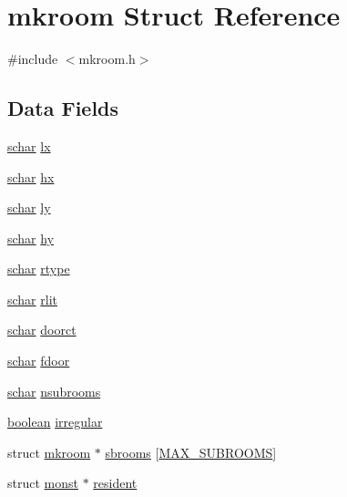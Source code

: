 \hypertarget{structmkroom}{\section{mkroom Struct Reference}
\label{structmkroom}
}


{\ttfamily \#include $<$mkroom.\+h$>$}

\subsection*{Data Fields}
\begin{DoxyCompactItemize}
\item 
\hyperlink{config_8h_a0fd9ce9d735064461bebfe6037026093}{schar} \hyperlink{structmkroom_afbd368ef987a49bd9ea830f2019a565f}{lx}
\item 
\hyperlink{config_8h_a0fd9ce9d735064461bebfe6037026093}{schar} \hyperlink{structmkroom_a1b738b591a7735add2af6d918c556543}{hx}
\item 
\hyperlink{config_8h_a0fd9ce9d735064461bebfe6037026093}{schar} \hyperlink{structmkroom_af60defeaae679cf06715a5b645e0d8b8}{ly}
\item 
\hyperlink{config_8h_a0fd9ce9d735064461bebfe6037026093}{schar} \hyperlink{structmkroom_aa767bcbf6e0de868bba6d2a1c7e7182e}{hy}
\item 
\hyperlink{config_8h_a0fd9ce9d735064461bebfe6037026093}{schar} \hyperlink{structmkroom_a0ad2dc1a7e0527610e96e830b2cad471}{rtype}
\item 
\hyperlink{config_8h_a0fd9ce9d735064461bebfe6037026093}{schar} \hyperlink{structmkroom_a3c07fba081cb449add4c4cc858541b16}{rlit}
\item 
\hyperlink{config_8h_a0fd9ce9d735064461bebfe6037026093}{schar} \hyperlink{structmkroom_af3299bfffb84e2a7cd1a07b4de7c1b53}{doorct}
\item 
\hyperlink{config_8h_a0fd9ce9d735064461bebfe6037026093}{schar} \hyperlink{structmkroom_ae40f76bfb5e37b9315e11abc5517b9d4}{fdoor}
\item 
\hyperlink{config_8h_a0fd9ce9d735064461bebfe6037026093}{schar} \hyperlink{structmkroom_ad45b51274d899541dc61dfa169e06ffb}{nsubrooms}
\item 
\hyperlink{global_8h_a531b10dd351aa162d7dcccd1966308b8}{boolean} \hyperlink{structmkroom_a394c3dd48b7fc60e0098c41afde6d6e8}{irregular}
\item 
struct \hyperlink{structmkroom}{mkroom} $\ast$ \hyperlink{structmkroom_ae0365d286660d2b39729c3e7a2c4dc66}{sbrooms} \mbox{[}\hyperlink{global_8h_a434176f3fe018fa4c6ba570d8fe36b14}{M\+A\+X\+\_\+\+S\+U\+B\+R\+O\+O\+M\+S}\mbox{]}
\item 
struct \hyperlink{structmonst}{monst} $\ast$ \hyperlink{structmkroom_af149eb253a29f709903a497918269d3c}{resident}
\end{DoxyCompactItemize}


